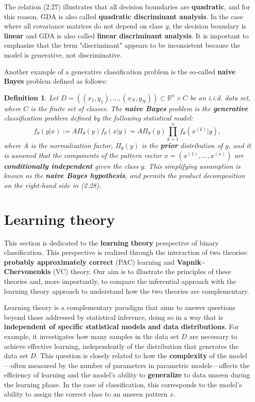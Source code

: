 \documentclass{report}
\newtheorem{definition}{Definition}[chapter]
\begin{document}
The relation (2.27) illustrates that all decision boundaries are \textbf{quadratic}, and for this reason, GDA is also called \textbf{quadratic discriminant analysis}. In the case where all covariance matrices do not depend on class $y$, the decision boundary is \textbf{linear} and GDA is also called \textbf{linear discriminant analysis}. It is important to emphasize that the term "discriminant" appears to be inconsistent because the model is generative, not discriminative.

Another example of a generative classification problem is the so-called \textbf{naive Bayes} problem defined as follows:

\begin{definition}
Let $D = ((x_1,y_1),\dots,(x_N,y_N)) \subset \mathbb{R}^n\times C$ be an i.i.d. data set, where $C$ is the finite set of classes. The \textbf{naive Bayes} problem is the \textbf{generative} classification problem defined by the following statistical model:
\begin{equation}
f_\theta(y|x) := A\Pi_\theta(y)f_\theta(x|y) = A \Pi_\theta(y)\prod_{k=1}^nf_\theta(x^{(k)}|y),
\end{equation}
where A is the normalization factor, $\Pi_\theta(y)$ is the \textbf{prior} distribution of $y$, and it is assumed that the components of the pattern vector $x = (x^{(1)},\dots,x^{(n)})$ are \textbf{conditionally independent} given the class $y$. This simplifying assumption is known as the \textbf{naive Bayes hypothesis}, and permits the product decomposition on the right-hand side in (2.28).
\end{definition}

\section{Learning theory}
This section is dedicated to the \textbf{learning theory} perspective of binary classification. This perspective is realized through the interaction of two theories: \textbf{probably approximately correct} (PAC) learning and \textbf{Vapnik–Chervonenkis} (VC) theory. Our aim is to illustrate the principles of these theories and, more importantly, to compare the inferential approach with the learning theory approach to understand how the two theories are complementary.

Learning theory is a complementary paradigm that aims to answer questions beyond those addressed by statistical inference, doing so in a way that is \textbf{independent of specific statistical models and data distributions}. For example, it investigates how many samples in the data set $D$ are necessary to achieve effective learning, independently of the distribution that generates the data set $D$. This question is closely related to how the \textbf{complexity} of the model—often measured by the number of parameters in parametric models—affects the efficiency of learning and the model’s ability to \textbf{generalize} to data unseen during the learning phase. In the case of classification, this corresponds to the model’s ability to assign the correct class to an unseen pattern $x$.
\end{document}
